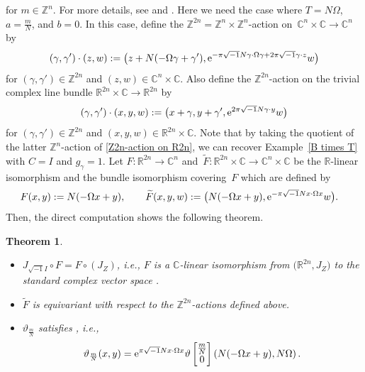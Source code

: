 \documentclass[pdftex]{sigma}
\numberwithin{equation}{section}
\newtheorem{Theorem}{Theorem}[section]
\newcommand{\C}{\mathbb{C}}
\newcommand{\R}{\mathbb{R}}
\newcommand{\Z}{\mathbb{Z}}
\renewcommand{\tilde}{\widetilde}
\begin{document}
for $m\in \Z^n$. For more details, see \cite[Chapter II, Section~1]{Mumford1} and \cite[Section~2]{Mumford3}.
%
Here we need the case where $T=N\Omega$, $a=\frac{m}{N}$, and $b=0$. In this case, define the $\Z^{2n}=\Z^n\times \Z^n$-action on~${\C^n\times \C\to \C^n}$ by
\begin{equation*}
(\gamma,\gamma')\cdot (z,w):=\bigl(z+N(-\Omega\gamma+\gamma'), {\rm e}^{-\pi\sqrt{-1}N\gamma \cdot \Omega\gamma +2\pi\sqrt{-1}\gamma \cdot z}w\bigr)
\end{equation*}
for $(\gamma,\gamma')\in \Z^{2n}$ and $(z,w)\in \C^n\times \C$. Also define the $\Z^{2n}$-action on the trivial complex line bundle $\R^{2n}\times \C\to \R^{2n}$ by
\begin{equation}\label{Z2n-action on R2n}
(\gamma,\gamma')\cdot (x,y,w):=\bigl(x+\gamma ,y+\gamma', {\rm e}^{2\pi\sqrt{-1}N\gamma\cdot y}w\bigr)
\end{equation}
for $(\gamma,\gamma')\in \Z^{2n}$ and $(x,y,w)\in \R^{2n}\times \C$. Note that by taking the quotient of the latter $\Z^n$-action of \eqref{Z2n-action on R2n}, we can recover Example~\ref{B times T} with $C=I$ and $g_\gamma=1$.
%
Let $F\colon \R^{2n}\to \C^n$ and~${{\tilde F}\colon \R^{2n}\times \C\to \C^n\times \C}$ be the $\R$-linear isomorphism and the bundle isomorphism covering~$F$ which are defined by
\begin{align*}
F(x,y)&:=N(-\Omega x+y) ,\qquad
{\tilde F}(x,y,w):=\bigl(N(-\Omega x+y) , {\rm e}^{-\pi\sqrt{-1}N x\cdot \Omega x}w\bigr) .
\end{align*}
Then, the direct computation shows the following theorem.
\begin{Theorem}\label{relation with theta}\quad
\begin{itemize}\itemsep=0pt
\item[$(1)$] $J_{\sqrt{-1}I}\circ F=F\circ (J_Z)$, i.e., $F$ is a $\C$-linear isomorphism from $\bigl(\R^{2n}, J_Z\bigr)$ to the standard complex vector space \smash{$(\C^n,J_{\sqrt{-1}I})$}.
\item[$(2)$] ${\tilde F}$ is equivariant with respect to the $\Z^{2n}$-actions defined above.
\item[$(3)$] $\vartheta_{\frac{m}{N}}$ satisfies \smash{${\tilde F}\circ \vartheta_{\frac{m}{N}}(x,y)=\vartheta
\left[
\begin{smallmatrix}
\frac{m}{N} \\
0
\end{smallmatrix}
\right]\left( F(x,y), N\Omega\right)$}, i.e.,
\[
\vartheta_{\frac{m}{N}}(x,y)={\rm e}^{\pi\sqrt{-1}N x\cdot \Omega x}\vartheta
\left[
\begin{matrix}
\frac{m}{N} \\
0
\end{matrix}
\right]\left( N(-\Omega x+y), N\Omega\right) .
\]
\end{itemize}
\end{Theorem}
\end{document}
